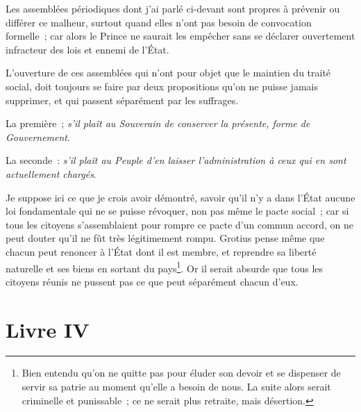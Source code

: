 \documentclass[french,twoside]{book} %
\begin{document}
Les assemblées périodiques dont j’ai parlé ci-devant sont propres à prévenir ou différer ce malheur, surtout quand elles n’ont pas besoin de convocation formelle ; car alors le Prince ne saurait les empêcher sans se déclarer ouvertement infracteur des lois et ennemi de l’État.\par
L’ouverture de ces assemblées qui n’ont pour objet que le maintien du traité social, doit toujours se faire par deux propositions qu’on ne puisse jamais supprimer, et qui passent séparément par les suffrages.\par
La première ; {\itshape s’il plaît au Souverain de conserver la présente, forme de Gouvernement}.\par
La seconde : {\itshape s’il plaît au Peuple d’en laisser l’administration à ceux qui en sont actuellement chargés}.\par
Je suppose ici ce que je crois avoir démontré, savoir qu’il n’y a dans l’État aucune loi fondamentale qui ne se puisse révoquer, non pas même le pacte social ; car si tous les citoyens s’assemblaient pour rompre ce pacte d’un commun accord, on ne peut douter qu’il ne fût très légitimement rompu. Grotius pense même que chacun peut renoncer à l’État dont il est membre, et reprendre sa liberté naturelle et ses biens en sortant du pays\footnote{Bien entendu qu’on ne quitte pas pour éluder son devoir et se dispenser de servir sa patrie au moment qu’elle a besoin de nous. La suite alors serait criminelle et punissable ; ce ne serait plus retraite, mais désertion.}. Or il serait absurde que tous les citoyens réunis ne pussent pas ce que peut séparément chacun d’eux.
\section[{Livre IV}]{Livre IV}\renewcommand{\leftmark}{Livre IV}
\end{document}
